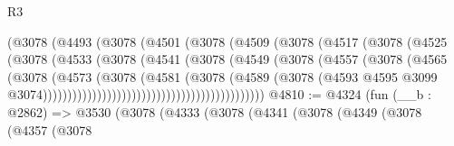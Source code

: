 \begin{lexlean}{R3}
\begin{coremodule}
                                      (@3078
                                        (@4493
                                          (@3078
                                            (@4501
                                              (@3078
                                                (@4509
                                                  (@3078
                                                    (@4517
                                                      (@3078
                                                        (@4525
                                                          (@3078
                                                            (@4533
                                                              (@3078
                                                                (@4541
                                                                  (@3078
                                                                    (@4549
                                                                      (@3078
                                                                        (@4557
                                                                          (@3078
                                                                            (@4565
                                                                              (@3078
                                                                                (@4573
                                                                                  (@3078
                                                                                    (@4581
                                                                                      (@3078
                                                                                        (@4589
                                                                                          (@3078
                                                                                            (@4593
                                                                                              @4595
                                                                                              @3099
                                                                                              @3074)))))))))))))))))))))))))))))))))))))))))))))
@4810 := @4324
    (fun (__b : @2862) =>
    @3530
      (@3078
        (@4333
          (@3078
            (@4341
              (@3078
                (@4349
                  (@3078
                    (@4357
                      (@3078

\end{coremodule}
\end{lexlean}
